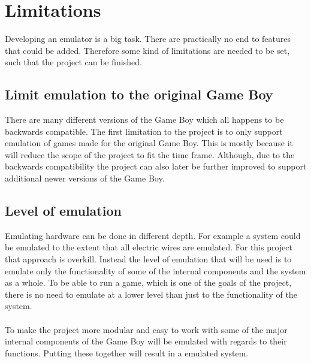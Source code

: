 \chapter{Limitations}\label{Limitations}


Developing an emulator is a big task. 
There are practically no end to features that could be added.
Therefore some kind of limitations are needed to be set, such that the project can be finished.

\section{Limit emulation to the original Game Boy}
There are many different versions of the Game Boy which all happens to be backwards compatible\cite{compatibility}.
The first limitation to the project is to only support emulation of games made for the original Game Boy.
This is mostly because it will reduce the scope of the project to fit the time frame.
Although, due to the backwards compatibility the project can also later be further improved to support additional newer versions of the Game Boy.


\section{Level of emulation}
Emulating hardware can be done in different depth.
For example a system could be emulated to the extent that all electric wires are emulated.
For this project that approach is overkill.
Instead the level of emulation that will be used is to emulate only the functionality of some of the internal components and the system as a whole.
To be able to run a game, which is one of the goals of the project, there is no need to emulate at a lower level than just to the functionality of the system.
\\\\
To make the project more modular and easy to work with some of the major internal components of the Game Boy will be emulated with regards to their functions.
Putting these together will result in a emulated system.


